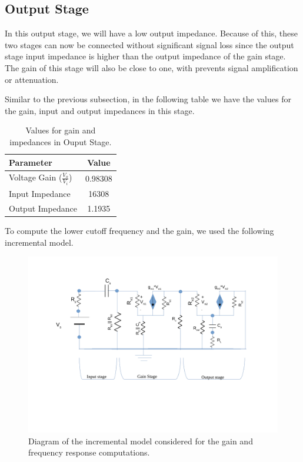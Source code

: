 \subsection{Output Stage}
\label{sec:output}


In this output stage, we will have a low output impedance. Because of this, these two stages can now be connected without significant signal loss since the output stage input impedance is higher than the output impedance of the gain stage. The gain of this stage will also be close to one, with prevents signal amplification or attenuation.

Similar to the previous subsection, in the following table we have the values for the gain, input and output impedances in this stage.

\begin{table}[h]
    \centering
    \begin{tabular}{|l|c|}
    \hline
    {\bf Parameter} & {\bf Value} \\ \hline \hline
    Voltage Gain ($\frac{V_{o}}{V_{i}}$)  & 0.98308\\ \hline
    Input Impedance & 16308\\ \hline
    Output Impedance  & 1.1935  \\ \hline
    \end{tabular}
    \caption{Values for gain and impedances in Ouput Stage.}
    \label{tab:values}
\end{table}

To compute the lower cutoff frequency and the gain, we used the following incremental model.

\begin{figure}[ht!] \centering
\includegraphics[width=0.95\linewidth]{Incremental_T4.pdf}

\caption{Diagram of the incremental model considered for the gain and frequency response computations.}
\label{fig:diagram_t4}
\end{figure}



